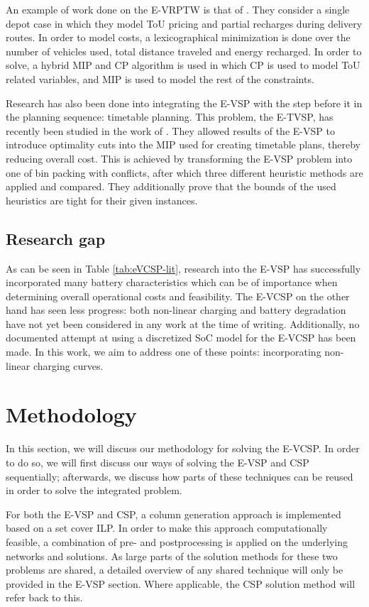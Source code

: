 \documentclass[]{article}
\begin{document}
An example of work done on the E-VRPTW is that of \citet{Ham2021}. They consider a single depot case in which they model ToU pricing and partial recharges during delivery routes. In order to model costs, a lexicographical minimization is done over the number of vehicles used, total distance traveled and energy recharged. In order to solve, a hybrid MIP and CP algorithm is used in which CP is used to model ToU related variables, and MIP is used to model the rest of the constraints.

Research has also been done into integrating the E-VSP with the step before it in the planning sequence: timetable planning. This problem, the E-TVSP, has recently been studied in the work of \citet{Stadnichuk2024}. They allowed results of the E-VSP to introduce optimality cuts into the MIP used for creating timetable plans, thereby reducing overall cost. This is achieved by transforming the E-VSP problem into one of bin packing with conflicts, after which three different heuristic methods are applied and compared. They additionally prove that the bounds of the used heuristics are tight for their given instances. 

\subsection{Research gap}
As can be seen in Table \ref{tab:eVCSP-lit}, research into the E-VSP has successfully incorporated many battery characteristics which can be of importance when determining overall operational costs and feasibility. The E-VCSP on the other hand has seen less progress: both non-linear charging and battery degradation have not yet been considered in any work at the time of writing. Additionally, no documented attempt at using a discretized SoC model for the E-VCSP has been made. In this work, we aim to address one of these points: incorporating non-linear charging curves. 

\section{Methodology}
In this section, we will discuss our methodology for solving the E-VCSP. In order to do so, we will first discuss our ways of solving the E-VSP and CSP sequentially; afterwards, we discuss how parts of these techniques can be reused in order to solve the integrated problem.

For both the E-VSP and CSP, a column generation approach is implemented based on a set cover ILP. In order to make this approach computationally feasible, a combination of pre- and postprocessing is applied on the underlying networks and solutions. As large parts of the solution methods for these two problems are shared, a detailed overview of any shared technique will only be provided in the E-VSP section. Where applicable, the CSP solution method will refer back to this. 
\end{document}
